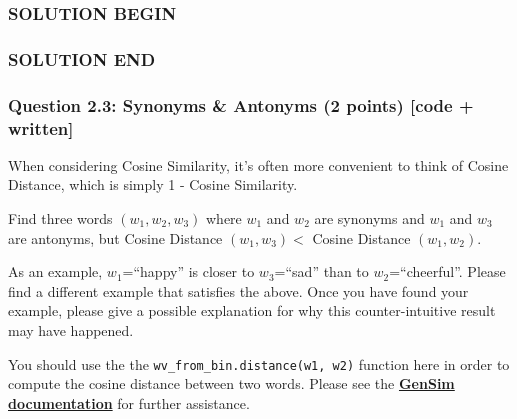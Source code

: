 \documentclass[11pt]{article}
\begin{document}
\subsubsection{SOLUTION BEGIN}\label{solution-begin}

\subsubsection{SOLUTION END}\label{solution-end}

\subsubsection{Question 2.3: Synonyms \& Antonyms (2 points) {[}code +
written{]}}\label{question-2.3-synonyms-antonyms-2-points-code-written}

When considering Cosine Similarity, it's often more convenient to think
of Cosine Distance, which is simply 1 - Cosine Similarity.

Find three words \((w_1,w_2,w_3)\) where \(w_1\) and \(w_2\) are
synonyms and \(w_1\) and \(w_3\) are antonyms, but Cosine Distance
\((w_1,w_3) <\) Cosine Distance \((w_1,w_2)\).

As an example, \(w_1\)=``happy'' is closer to \(w_3\)=``sad'' than to
\(w_2\)=``cheerful''. Please find a different example that satisfies the
above. Once you have found your example, please give a possible
explanation for why this counter-intuitive result may have happened.

You should use the the \texttt{wv\_from\_bin.distance(w1,\ w2)} function
here in order to compute the cosine distance between two words. Please
see the
\textbf{\href{https://radimrehurek.com/gensim/models/keyedvectors.html\#gensim.models.keyedvectors.FastTextKeyedVectors.distance}{GenSim
        documentation}} for further assistance.
\end{document}
